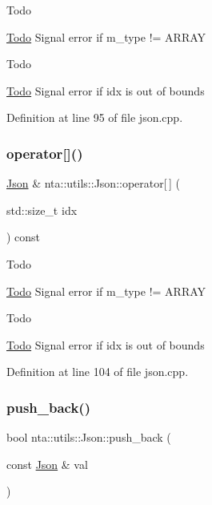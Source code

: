 \begin{DoxyRefDesc}{Todo}
\item[\hyperlink{todo__todo000019}{Todo}]Signal error if m\+\_\+type != A\+R\+R\+AY \end{DoxyRefDesc}
\begin{DoxyRefDesc}{Todo}
\item[\hyperlink{todo__todo000020}{Todo}]Signal error if idx is out of bounds \end{DoxyRefDesc}


Definition at line 95 of file json.\+cpp.

\mbox{\label{classnta_1_1utils_1_1Json_a893f191111e604995488d147aaa711f8}} 
\subsubsection{\texorpdfstring{operator[]()}{operator[]()}\hspace{0.1cm}{\footnotesize\ttfamily [4/4]}}
{\footnotesize\ttfamily \hyperlink{classnta_1_1utils_1_1Json}{Json} \& nta\+::utils\+::\+Json\+::operator\mbox{[}$\,$\mbox{]} (\begin{DoxyParamCaption}\item[{std\+::size\+\_\+t}]{idx }\end{DoxyParamCaption}) const}

\begin{DoxyRefDesc}{Todo}
\item[\hyperlink{todo__todo000021}{Todo}]Signal error if m\+\_\+type != A\+R\+R\+AY \end{DoxyRefDesc}
\begin{DoxyRefDesc}{Todo}
\item[\hyperlink{todo__todo000022}{Todo}]Signal error if idx is out of bounds \end{DoxyRefDesc}


Definition at line 104 of file json.\+cpp.

\mbox{\label{classnta_1_1utils_1_1Json_a2015e471fd47c1a077ca752c9b1fabbd}} 
\subsubsection{\texorpdfstring{push\+\_\+back()}{push\_back()}}
{\footnotesize\ttfamily bool nta\+::utils\+::\+Json\+::push\+\_\+back (\begin{DoxyParamCaption}\item[{const \hyperlink{classnta_1_1utils_1_1Json}{Json} \&}]{val }\end{DoxyParamCaption})}

